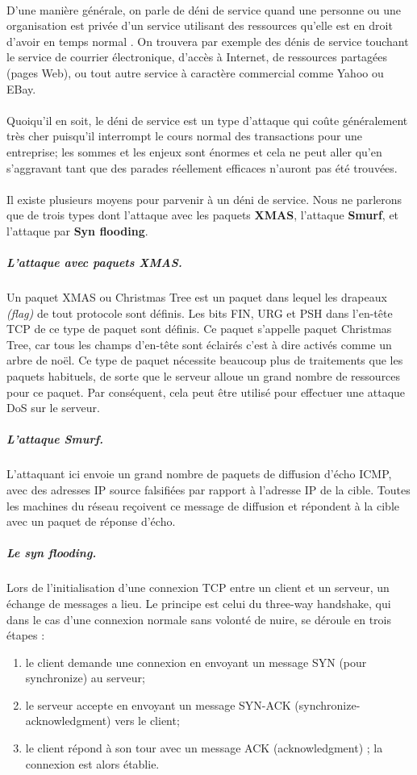     \paragraph{}
      D'une manière générale, on parle de déni de service quand une personne ou une organisation est privée d'un service utilisant des ressources qu'elle est en droit d'avoir en temps normal \cite{B}. On trouvera par exemple des dénis de service touchant le service de courrier électronique, d'accès à Internet, de ressources partagées (pages Web), ou tout autre service à caractère commercial comme Yahoo ou EBay.\\ \\
      Quoiqu'il en soit, le déni de service est un type d'attaque qui coûte généralement très cher puisqu'il interrompt le cours normal des transactions pour une entreprise; les sommes et les enjeux sont énormes et cela ne peut aller qu'en s'aggravant tant que des parades réellement efficaces n'auront pas été trouvées.\\ \\
      Il existe plusieurs moyens pour parvenir à un déni de service. Nous ne parlerons que de trois types dont l'attaque avec les paquets \textbf{XMAS}, l'attaque \textbf{Smurf}, et l'attaque par \textbf{Syn flooding}.

      \subparagraph*{L'attaque avec paquets XMAS.}
	Un paquet XMAS ou Christmas Tree est un paquet dans lequel les drapeaux \textit{(flag)} de tout protocole sont définis. Les bits FIN, URG et PSH dans l'en-tête TCP de ce type de paquet sont définis. Ce paquet s'appelle paquet Christmas Tree, car tous les champs d'en-tête sont éclairés c'est à dire activés comme un arbre de noël. Ce type de paquet nécessite beaucoup plus de traitements que les paquets habituels, de sorte que le serveur alloue un grand nombre de ressources pour ce paquet. Par conséquent, cela peut être utilisé pour effectuer une attaque DoS sur le serveur.

      \subparagraph{L'attaque Smurf.}
	L'attaquant ici envoie un grand nombre de paquets de diffusion d'écho ICMP, avec des adresses IP source falsifiées par rapport à l'adresse IP de la cible. Toutes les machines du réseau reçoivent ce message de diffusion et répondent à la cible avec un paquet de réponse d'écho.

      \subparagraph{Le syn flooding.}
	Lors de l'initialisation d'une connexion TCP entre un client et un serveur, un échange de messages a lieu. Le principe est celui du three-way handshake, qui dans le cas d'une connexion normale sans volonté de nuire, se déroule en trois étapes :
	\begin{enumerate}
	  \item le client demande une connexion en envoyant un message SYN (pour synchronize) au serveur;
	  \item le serveur accepte en envoyant un message SYN-ACK (synchronize-acknowledgment) vers le client;
	  \item le client répond à son tour avec un message ACK (acknowledgment) ; la connexion est alors établie.
	\end{enumerate}
	
